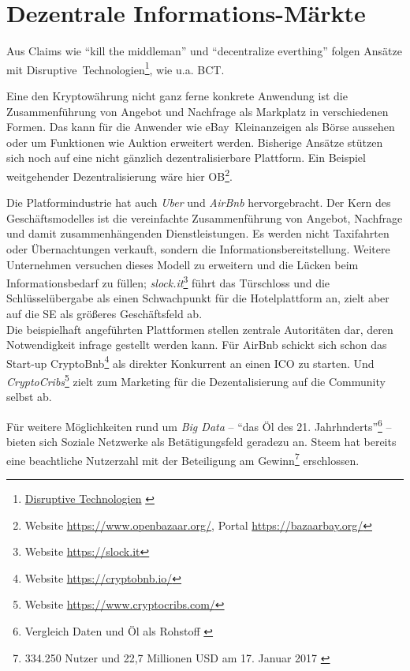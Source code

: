 
\section{Dezentrale Informations-Märkte}

Aus Claims wie \enquote{kill the middleman} und \enquote{decentralize everthing} folgen Ansätze mit \mbox{Disruptive Technologien}\footnote{\href{http://wirtschaftslexikon.gabler.de/Definition/disruptive-technologien.html}{Disruptive Technologien} \autocite{w:lexika-econimics}}, wie u.a. \gls{BCT}.

Eine den Kryptowährung nicht ganz ferne konkrete Anwendung ist die Zusammenführung von Angebot und Nachfrage als Markplatz in verschiedenen Formen. Das kann für die Anwender wie \mbox{eBay Kleinanzeigen} als Börse aussehen oder um Funktionen wie Auktion erweitert werden. Bisherige Ansätze stützen sich noch auf eine nicht gänzlich dezentralisierbare Plattform. Ein Beispiel weitgehender Dezentralisierung wäre hier \gls{OB}\footnote{Website \url{https://www.openbazaar.org/}, Portal \url{https://bazaarbay.org/}}.

Die Platformindustrie hat auch \emph{Uber} und \emph{AirBnb} hervorgebracht. Der Kern des Geschäftsmodelles ist die vereinfachte Zusammenführung von Angebot, Nachfrage und damit zusammenhängenden Dienstleistungen. Es werden nicht Taxifahrten oder Übernachtungen verkauft, sondern die Informationsbereitstellung. Weitere Unternehmen versuchen dieses Modell zu erweitern und die Lücken beim Informationsbedarf zu füllen; \emph{slock.it}\footnote{Website \url{https://slock.it}} führt das Türschloss und die Schlüsselübergabe als einen Schwachpunkt für die Hotelplattform an, zielt aber auf die \gls{SE} als größeres Geschäftsfeld ab.\\
Die beispielhaft angeführten Plattformen stellen zentrale Autoritäten dar, deren Notwendigkeit infrage gestellt werden kann. Für AirBnb schickt sich schon das Start-up CryptoBnb\footnote{Website \url{https://cryptobnb.io/}} als direkter Konkurrent an einen \gls{ICO} zu starten. Und \emph{CryptoCribs}\footnote{Website \url{https://www.cryptocribs.com/}} zielt zum Marketing für die Dezentalisierung auf die Community selbst ab.

Für weitere Möglichkeiten rund um \emph{Big Data}%
 -- \enquote{das Öl des 21. Jahrhnderts}\footnote{Vergleich Daten und Öl als Rohstoff \autocite{b:spitz-daten}} -- bieten sich Soziale Netzwerke als Betätigungsfeld geradezu an. Steem hat bereits eine beachtliche Nutzerzahl mit der Beteiligung am Gewinn\footnote{334.250 Nutzer und 22,7 Millionen USD am 17. Januar 2017 \autocite{w:steem}} erschlossen. 

